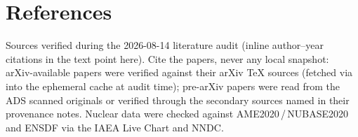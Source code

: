 %

\section*{References}
\label{sec:references}

Sources verified during the 2026-08-14 literature audit (inline author--year
citations in the text point here). Cite the papers, never any local snapshot:
arXiv-available papers were verified against their arXiv \TeX{} sources
(fetched via  into the ephemeral
 cache at audit time); pre-arXiv papers were read from
the ADS scanned originals or verified through the secondary sources named in
their provenance notes. Nuclear data were checked against AME2020\,/\,NUBASE2020
and ENSDF via the IAEA Live Chart and NNDC.


